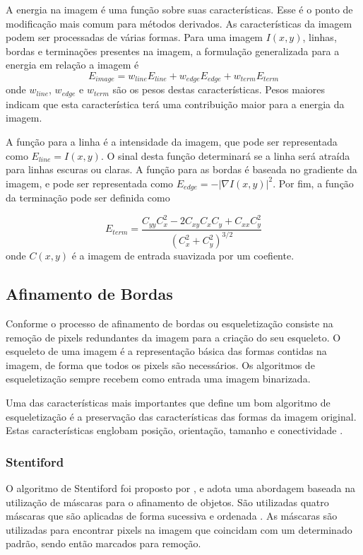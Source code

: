 \documentclass[12pt,oneside,a4paper,english,french,spanish,brazil,]{abntex2}
\begin{document}
A energia na imagem é uma função sobre suas características. Esse é o ponto de modificação mais comum para métodos derivados. As características da imagem podem ser processadas de várias formas. Para uma imagem \(I(x,y)\), linhas, bordas e terminações presentes na imagem, a formulação generalizada para a energia em relação a imagem é 
\[E_{image}=w_{line}E_{line}+w_{edge}E_{edge}+w_{term}E_{term}\]
onde \(w_{line}\), \(w_{edge}\) e \(w_{term}\) são os pesos destas características. Pesos maiores indicam que esta característica terá uma contribuição maior para a energia da imagem.

A função para a linha é a intensidade da imagem, que pode ser representada como \(E_{{line}}=I(x,y)\). O sinal desta função determinará se a linha será atraída para linhas escuras ou claras. A função para as bordas é baseada no gradiente da imagem, e pode ser representada como \(E_{edge}=-\left|\nabla I(x,y)\right\vert ^{2}\). Por fim, a função da terminação pode ser definida como 

\[E_{term}=\frac{C_{yy}C_{x}^{2}-2C_{xy}C_{x}C_{y}+C_{xx}C_{y}^{2}}{(C_{x}^{2}+C_{y}^{2})^{3/2}}\] 
onde \(C(x,y)\) é a imagem de entrada suavizada por um coefiente.


\subsection{Afinamento de Bordas}

Conforme \citet{guilherme:2007} o processo de afinamento de bordas ou esqueletização consiste na remoção de pixels redundantes da imagem para a criação do seu esqueleto. O esqueleto de uma imagem é a representação básica das formas contidas na imagem, de forma que todos os pixels são necessários. Os algoritmos de esqueletização sempre recebem como entrada uma imagem binarizada.

Uma das características mais importantes que define um bom algoritmo de esqueletização é a preservação das características das formas da imagem original. Estas características englobam posição, orientação, tamanho e conectividade \cite{guilherme:2007}.

\subsubsection{Stentiford}

O algoritmo de Stentiford foi proposto por \citet{stentiford:1983}, e adota uma abordagem baseada na utilização de máscaras para o afinamento de objetos. São utilizadas quatro máscaras que são aplicadas de forma sucessiva e ordenada \cite{guilherme:2007}. As máscaras são utilizadas para encontrar pixels na imagem que coincidam com um determinado padrão, sendo então marcados para remoção.
\end{document}
